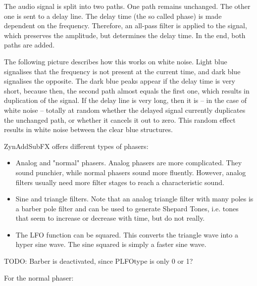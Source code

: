    The audio signal is split into two paths. One path remains unchanged. The
   other one is sent to a delay line. The delay time (the so called phase) is
   made dependent on the frequency. Therefore, an all-pass filter is applied
   to the signal, which preserves the amplitude, but determines the delay
   time. In the end, both paths are added.

   The following picture describes how this works on white noise. Light blue
   signalises that the frequency is not present at the current time, and dark
   blue signalises the opposite. The dark blue peaks appear if the delay time
   is very short, because then, the second path almost equals the first one,
   which results in duplication of the signal. If the delay line is very
   long, then it is -- in the case of white noise -- totally at random
   whether the delayed signal currently duplicates the unchanged path, or
   whether it cancels it out to zero. This random effect results in white
   noise between the clear blue structures.

   ZynAddSubFX offers different types of phasers:

   \begin{itemize}
      \item Analog and "normal" phasers. Analog phasers are more complicated.
      They sound punchier, while normal phasers sound more fluently. However,
      analog filters usually need more filter stages to reach a
      characteristic sound.
      \item Sine and triangle filters. Note that an analog triangle filter
      with many poles is a barber pole filter and can be used to generate
      Shepard Tones, i.e. tones that seem to increase or decrease with time,
      but do not really.
      \item The LFO function can be squared. This converts the triangle wave
      into a hyper sine wave. The sine squared is simply a faster sine wave.
   \end{itemize}

   TODO: Barber is deactivated, since PLFOtype is only 0 or 1?

   For the normal phaser:
   
